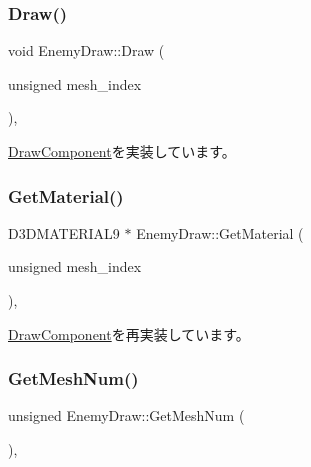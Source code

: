 \subsubsection{\texorpdfstring{Draw()}{Draw()}}
{\footnotesize\ttfamily void Enemy\+Draw\+::\+Draw (\begin{DoxyParamCaption}\item[{unsigned}]{mesh\+\_\+index }\end{DoxyParamCaption})\hspace{0.3cm}{\ttfamily [override]}, {\ttfamily [virtual]}}



\mbox{\hyperlink{class_draw_component_ae84bfb6ccc2fda9e54cdff45057ea2c3}{Draw\+Component}}を実装しています。

\mbox{\label{class_enemy_draw_a081c6a1c8c007b604885e6fbd0ee3641}} 
\subsubsection{\texorpdfstring{Get\+Material()}{GetMaterial()}}
{\footnotesize\ttfamily D3\+D\+M\+A\+T\+E\+R\+I\+A\+L9 $\ast$ Enemy\+Draw\+::\+Get\+Material (\begin{DoxyParamCaption}\item[{unsigned}]{mesh\+\_\+index }\end{DoxyParamCaption})\hspace{0.3cm}{\ttfamily [override]}, {\ttfamily [virtual]}}



\mbox{\hyperlink{class_draw_component_adae078d5139f691997763bf6cac9e25a}{Draw\+Component}}を再実装しています。

\mbox{\label{class_enemy_draw_af61c817f8c00dae7aa990544721a2e15}} 
\subsubsection{\texorpdfstring{Get\+Mesh\+Num()}{GetMeshNum()}}
{\footnotesize\ttfamily unsigned Enemy\+Draw\+::\+Get\+Mesh\+Num (\begin{DoxyParamCaption}{ }\end{DoxyParamCaption})\hspace{0.3cm}{\ttfamily [override]}, {\ttfamily [virtual]}}



